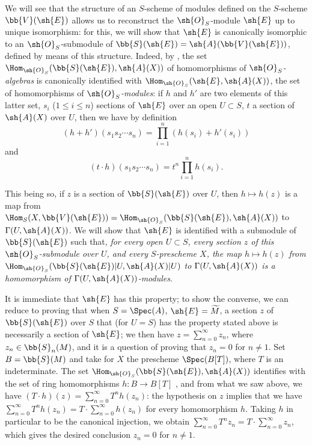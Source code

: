 \begin{env}[1.7.14]
\label{II.1.7.14}
We will see that the structure of an $S$-scheme of modules defined on the $S$-scheme $\bb{V}(\sh{E})$ allows us to reconstruct the $\sh{O}_S$-module $\sh{E}$ up to unique isomorphism: for this, we will show that $\sh{E}$ is canonically isomorphic to an $\sh{O}_S$-submodule of $\bb{S}(\sh{E})=\sh{A}(\bb{V}(\sh{E}))$, defined by means of this structure.
Indeed, by , the set $\Hom_{\sh{O}_S}(\bb{S}(\sh{E}),\sh{A}(X))$ of homomorphisms of \emph{$\sh{O}_S$-algebras} is canonically identified with $\Hom_{\sh{O}_S}(\sh{E},\sh{A}(X))$, the set of homomorphisms of \emph{$\sh{O}_S$-modules}: if $h$ and $h'$ are two elements of this latter set, $s_i$ ($1\leq i\leq n$) sections of $\sh{E}$ over an open $U\subset S$, $t$ a section of $\sh{A}(X)$ over $U$, then we have by definition
\[
  (h+h')(s_1 s_2\cdots s_n)=\prod_{i=1}^n(h(s_i)+h'(s_i))
\]
and
\[
  (t\cdot h)(s_1 s_2\cdots s_n)=t^n\prod_{i=1}^n h(s_i).
\]

This being so, if $z$ is a section of $\bb{S}(\sh{E})$ over $U$, then $h\mapsto h(z)$ is a map from $\Hom_S(X,\bb{V}(\sh{E}))=\Hom_{\sh{O}_S}(\bb{S}(\sh{E}),\sh{A}(X))$ to $\Gamma(U,\sh{A}(X))$.
We will
show that $\sh{E}$ is identified with a submodule of $\bb{S}(\sh{E})$ such that, \emph{for every open $U\subset S$, every section $z$ of this $\sh{O}_S$-submodule over $U$, and every $S$-prescheme $X$, the map $h\mapsto h(z)$ from $\Hom_{\sh{O}_S}(\bb{S}(\sh{E})|U,\sh{A}(X)|U)$ to $\Gamma(U,\sh{A}(X))$ is a homomorphism of $\Gamma(U,\sh{A}(X))$-modules}.

It is immediate that $\sh{E}$ has this property; to show the converse, we can reduce to proving that when $S=\Spec(A)$, $\sh{E}=\widetilde{M}$, a section $z$ of $\bb{S}(\sh{E})$ over $S$ that (for $U=S$) has the property stated above is necessarily a section of $\sh{E}$; we then have $z=\sum_{n=0}^\infty z_n$, where $z_n\in\bb{S}_n(M)$, and it is a question of proving that $z_n=0$ for $n\neq 1$.
Set $B=\bb{S}(M)$ and take for $X$ the prescheme $\Spec(B[T])$, where $T$ is an indeterminate.
The set $\Hom_{\sh{O}_S}(\bb{S}(\sh{E}),\sh{A}(X))$ identifies with the set of ring homomorphisms $h:B\to B[T]$ , and from what we saw above, we have $(T\cdot h)(z)=\sum_{n=0}^\infty T^n h(z_n)$: the hypothesis on $z$ implies that we have $\sum_{n=0}^\infty T^n h(z_n)=T\cdot\sum_{n=0}^\infty h(z_n)$ for every homomorphism $h$.
Taking $h$ in particular to be the canonical injection, we obtain $\sum_{n=0}^\infty T^n z_n=T\cdot\sum_{n=0}^\infty z_n$, which gives the desired conclusion $z_n=0$ for $n\neq 1$.
\end{env}

